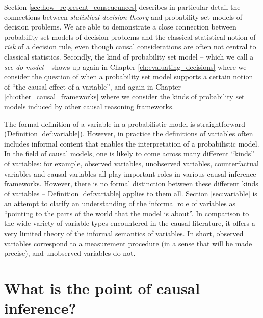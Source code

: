 Section \ref{sec:how_represent_conseqeunces} describes in particular detail the connections between \emph{statistical decision theory} \citep{wald_statistical_1950} and probability set models of decision problems. We are able to demonstrate a close connection between probability set models of decision problems and the classical statistical notion of \emph{risk} of a decision rule, even though causal considerations are often not central to classical statistics. Secondly, the kind of probability set model -- which we call a \emph{see-do model} -- shows up again in Chapter \ref{ch:evaluating_decisions} where we consider the question of when a probability set model supports a certain notion of ``the causal effect of a variable'', and again in Chapter \ref{ch:other_causal_frameworks} where we consider the kinds of probability set models induced by other causal reasoning frameworks.

The formal definition of a variable in a probabilistic model is straightforward (Definition \ref{def:variable}). However, in practice the definitions of variables often includes informal content that enables the interpretation of a probabilistic model. In the field of causal models, one is likely to come across many different ``kinds'' of variables: for example, observed variables, unobserved variables, counterfactual variables and causal variables all play important roles in various causal inference frameworks. However, there is no formal distinction between these different kinds of variables -- Definition \ref{def:variable} applies to them all. Section \ref{sec:variable} is an attempt to clarify an understanding of the informal role of variables as ``pointing to the parts of the world that the model is about''. In comparison to the wide variety of variable types encountered in the causal literature, it offers a very limited theory of the informal semantics of variables. In short, observed variables correspond to a measurement procedure (in a sense that will be made precise), and unobserved variables do not.

\section{What is the point of causal inference?}\label{sec:whats_the_point}


